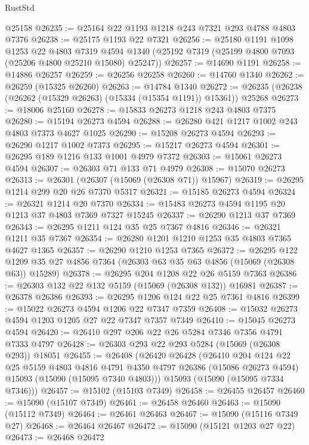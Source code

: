 \begin{lexlean}{RustStd}
\begin{coremodule}
    @25158
@26235 := @25164 @22 @1193 @1218 @243 @7321 @293 @4788 @4803 @7376
@26238 := @25175 @1193 @22 @7321
@26256 := @25180
    @1191
    @1098
    @1253
    @22
    @4803
    @7319
    @4594
    @1340
    (@25192 @7319 (@25199 @4800 @7093 (@25206 @4800 @25210 @15080) @25247))
@26257 := @14690 @1191
@26258 := @14886 @26257
@26259 := @26256 @26258
@26260 := @14760 @1340
@26262 := @26259 (@15325 @26260)
@26263 := @14784 @1340
@26272 := @26235 (@26238 (@26262 (@15329 @26263) (@15334 (@15354 @1191)) @15361)) @25268
@26273 := @18006 @25160
@26278 := @15833 @26273 @1218 @243 @4803 @7375
@26280 := @15194 @26273 @4594
@26288 := @26280 @421 @1217 @1002 @243 @4803 @7373 @4627 @1025
@26290 := @15208 @26273 @4594
@26293 := @26290 @1217 @1002 @7373
@26295 := @15217 @26273 @4594
@26301 := @26295 @189 @1216 @133 @1001 @4979 @7372
@26303 := @15061 @26273 @4594
@26307 := @26303 @71 @133 @71 @4979
@26308 := @15070 @26273
@26313 := @26301 (@26307 (@15069 (@26308 @71)) @15967)
@26319 := @26295 @1214 @299 @20 @26 @7370 @5317
@26321 := @15185 @26273 @4594
@26324 := @26321 @1214 @20 @7370
@26334 := @15483 @26273 @4594 @1195 @20 @1213 @37 @4803 @7369 @7327 @15245
@26337 := @26290 @1213 @37 @7369
@26343 := @26295 @1211 @124 @35 @25 @7367 @4816
@26346 := @26321 @1211 @35 @7367
@26354 := @26280 @1201 @1210 @1253 @35 @4803 @7365 @4627 @1365
@26357 := @26290 @1210 @1253 @7365
@26372 := @26295
    @122
    @1209
    @35
    @27
    @4856
    @7364
    (@26303 @63 @35 @63 @4856 (@15069 (@26308 @63)) @15289)
@26378 := @26295 @204 @1208 @22 @26 @5159 @7363
@26386 := @26303 @132 @22 @132 @5159 (@15069 (@26308 @132)) @16981
@26387 := @26378 @26386
@26393 := @26295 @1206 @124 @22 @25 @7361 @4816
@26399 := @15022 @26273 @4594 @1206 @22 @7347 @7359
@26408 := @15032 @26273 @4594 @1203 @1205 @27 @22 @7347 @7357 @7349
@26410 := @15045 @26273 @4594
@26420 := @26410 @297 @206 @22 @26 @5284 @7346 @7356 @4791 @7333 @4797
@26428 := @26303 @293 @22 @293 @5284 (@15069 (@26308 @293)) @18051
@26455 := @26408
    (@26420
      @26428
      (@26410
        @204
        @124
        @22
        @25
        @5159
        @4803
        @4816
        @4791
        @4350
        @4797
        @26386
        (@15086 @26273 @4594)
        @15093
        (@15090 (@15095 @7340 @4803)))
      @15093
      (@15090 (@15095 @7334 @7346)))
@26457 := @15102 (@15103 @7349)
@26458 := @26455 @26457
@26460 := @15090 (@15107 @7349)
@26461 := @26458 @26460
@26463 := @15090 (@15112 @7349)
@26464 := @26461 @26463
@26467 := @15090 (@15116 @7349 @27)
@26468 := @26464 @26467
@26472 := @15090 (@15121 @1203 @27 @22)
@26473 := @26468 @26472

\end{coremodule}
\end{lexlean}
